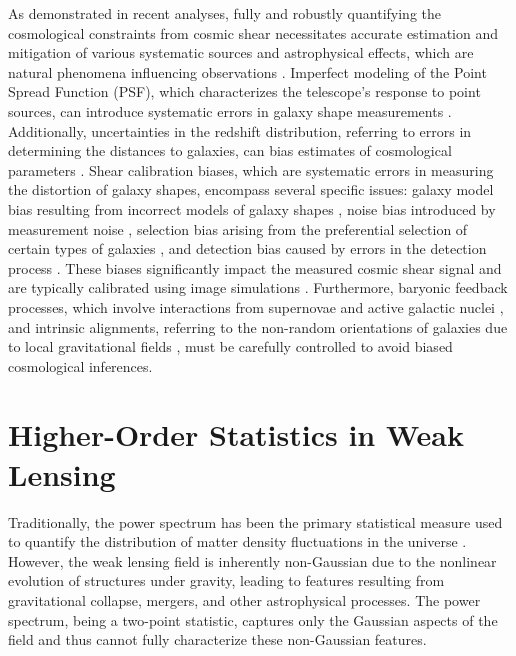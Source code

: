 As demonstrated in recent analyses, fully and robustly quantifying the cosmological constraints from cosmic shear necessitates accurate estimation and mitigation of various systematic sources and astrophysical effects, which are natural phenomena influencing observations \citep{2023PhRvD.108l3519D}. Imperfect modeling of the Point Spread Function (PSF), which characterizes the telescope's response to point sources, can introduce systematic errors in galaxy shape measurements \citep{2023MNRAS.525.2441Z}. Additionally, uncertainties in the redshift distribution, referring to errors in determining the distances to galaxies, can bias estimates of cosmological parameters \citep{2023MNRAS.518..709Z}. Shear calibration biases, which are systematic errors in measuring the distortion of galaxy shapes, encompass several specific issues: galaxy model bias resulting from incorrect models of galaxy shapes \citep{2010MNRAS.406.2793B}, noise bias introduced by measurement noise \citep{2012MNRAS.425.1951R}, selection bias arising from the preferential selection of certain types of galaxies \citep{2000ApJ...537..555K}, and detection bias caused by errors in the detection process \citep{2020ApJ...902..138S}. These biases significantly impact the measured cosmic shear signal and are typically calibrated using image simulations \citep{2018MNRAS.481.3170M}. Furthermore, baryonic feedback processes, which involve interactions from supernovae and active galactic nuclei \citep{2016MNRAS.459.1468M, 2018MNRAS.480.3962C}, and intrinsic alignments, referring to the non-random orientations of galaxies due to local gravitational fields \citep{2015SSRv..193....1J, 2015SSRv..193..139K, 2015SSRv..193...67K}, must be carefully controlled to avoid biased cosmological inferences.

\section{Higher-Order Statistics in Weak Lensing}
Traditionally, the power spectrum has been the primary statistical measure used to quantify the distribution of matter density fluctuations in the universe \citep{2019PASJ...71...43H, 2023PhRvD.108l3519D}. However, the weak lensing field is inherently non-Gaussian due to the nonlinear evolution of structures under gravity, leading to features resulting from gravitational collapse, mergers, and other astrophysical processes. The power spectrum, being a two-point statistic, captures only the Gaussian aspects of the field and thus cannot fully characterize these non-Gaussian features.

